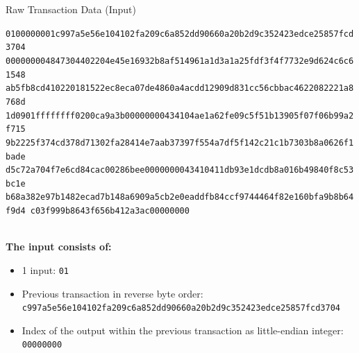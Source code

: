 \documentclass[]{beamer}
\begin{document}
\begin{frame}{Raw Transaction Data (Input)}
\begin{scriptsize}
\texttt{\textcolor{black!30}{01000000}{\alert<2>{01}\alert<3>{c997a5e56e104102fa209c6a852dd90660a20b2d9c352423edce25857fcd3704}
\alert<4>{00000000}}\textcolor{black!30}{4847304402204e45e16932b8af514961a1d3a1a25fdf3f4f7732e9d624c6c61548
ab5fb8cd410220181522ec8eca07de4860a4acdd12909d831cc56cbbac4622082221a8768d
1d0901ffffffff0200ca9a3b00000000434104ae1a62fe09c5f51b13905f07f06b99a2f715
9b2225f374cd378d71302fa28414e7aab37397f554a7df5f142c21c1b7303b8a0626f1bade
d5c72a704f7e6cd84cac00286bee0000000043410411db93e1dcdb8a016b49840f8c53bc1e
b68a382e97b1482ecad7b148a6909a5cb2e0eaddfb84ccf9744464f82e160bfa9b8b64f9d4
c03f999b8643f656b412a3ac00000000}}
\end{scriptsize}
\vspace{1em}
\scriptsize \\
\textbf{The input consists of:}\\
\begin{itemize}
	\item \alert<2>{1 input: \texttt{01}}
	\item \alert<3>{Previous transaction in reverse byte order: \texttt{c997a5e56e104102fa209c6a852dd90660a20b2d9c352423edce25857fcd3704}}
	\item \alert<4>{Index of the output within the previous transaction as little-endian integer: \texttt{00000000}}
\end{itemize}
\end{frame}
\end{document}
